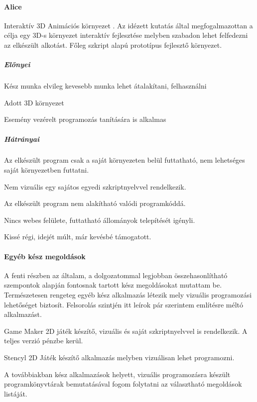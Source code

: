 \documentclass[12pt,a4paper,oneside]{report} %
\begin{document}
\paragraph{Alice} Interaktív 3D Animációs környezet \cite{cooper2000alice}. Az idézett kutatás által megfogalmazottan a  célja egy 3D-s környezet interaktív fejlesztése melyben szabadon lehet felfedezni az elkészült alkotást. Főleg szkript alapú prototípus fejlesztő környezet. 
\subparagraph{Előnyei} 
\begin{compactitem}
	\item Kész munka elvileg kevesebb munka lehet átalakítani, felhasználni
	\item Adott 3D környezet
	\item Esemény vezérelt programozás tanítására is alkalmas
\end{compactitem}
\subparagraph{Hátrányai} 
\begin{compactitem}
	\item Az elkészült program csak a saját környezeten belül futtatható, nem lehetséges saját környezetben futtatni.
	\item Nem vizuális egy sajátos egyedi szkriptnyelvvel rendelkezik.
	\item Az elkészült program nem alakítható valódi programkóddá.
	\item Nincs webes felülete, futtatható állományok telepítését igényli.
	\item Kissé régi, idejét múlt, már kevésbé támogatott.
\end{compactitem}

\paragraph{Egyéb kész megoldások}
A fenti részben az általam, a dolgozatommal legjobban összehasonlítható szempontok alapján fontosnak tartott kész megoldásokat mutattam be. Természetesen rengeteg egyéb kész alkalmazás létezik mely vizuális programozási lehetőséget biztosít. Felsorolás szintjén itt leírok pár szerintem említésre méltó alkalmazást. 
\begin{compactitem}
	\item Game Maker \cite{jenson2016exploring} 2D játék készítő, vizuális és saját szkriptnyelvvel is rendelkezik. A teljes verzió pénzbe kerül.
	\item Stencyl \cite{liu2014making} 2D Játék készítő alkalmazás melyben vizuálisan lehet programozni.
\end{compactitem}
A továbbiakban kész alkalmazások helyett, vizuális programozásra készült programkönyvtárak bemutatásával fogom folytatni az választható megoldások listáját.  
\end{document}
